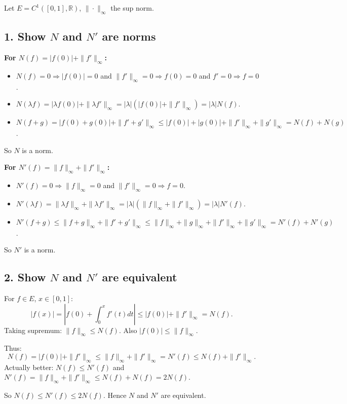 \documentclass[12pt]{article}
\begin{document}
\begin{answerbox}
Let $E = C^1([0,1], \mathbb{R})$, $\|\cdot\|_\infty$ the sup norm.

\subsection*{1. Show $N$ and $N'$ are norms}

\textbf{For $N(f) = |f(0)| + \|f'\|_\infty$:}
\begin{itemize}
    \item $N(f) = 0 \Rightarrow |f(0)| = 0$ and $\|f'\|_\infty = 0 \Rightarrow f(0) = 0$ and $f' = 0 \Rightarrow f = 0$.
    \item $N(\lambda f) = |\lambda f(0)| + \|\lambda f'\|_\infty = |\lambda|(|f(0)| + \|f'\|_\infty) = |\lambda| N(f)$.
    \item $N(f+g) = |f(0)+g(0)| + \|f'+g'\|_\infty \leq |f(0)| + |g(0)| + \|f'\|_\infty + \|g'\|_\infty = N(f) + N(g)$.
\end{itemize}
So $N$ is a norm.

\textbf{For $N'(f) = \|f\|_\infty + \|f'\|_\infty$:}
\begin{itemize}
    \item $N'(f) = 0 \Rightarrow \|f\|_\infty = 0$ and $\|f'\|_\infty = 0 \Rightarrow f = 0$.
    \item $N'(\lambda f) = \|\lambda f\|_\infty + \|\lambda f'\|_\infty = |\lambda|(\|f\|_\infty + \|f'\|_\infty) = |\lambda| N'(f)$.
    \item $N'(f+g) \leq \|f+g\|_\infty + \|f'+g'\|_\infty \leq \|f\|_\infty + \|g\|_\infty + \|f'\|_\infty + \|g'\|_\infty = N'(f) + N'(g)$.
\end{itemize}
So $N'$ is a norm.

\subsection*{2. Show $N$ and $N'$ are equivalent}

For $f \in E$, $x \in [0,1]$:
\[
|f(x)| = \left|f(0) + \int_0^x f'(t) dt\right| \leq |f(0)| + \|f'\|_\infty = N(f).
\]
Taking supremum: $\|f\|_\infty \leq N(f)$. Also $|f(0)| \leq \|f\|_\infty$.

Thus:
\[
N(f) = |f(0)| + \|f'\|_\infty \leq \|f\|_\infty + \|f'\|_\infty = N'(f) \leq N(f) + \|f'\|_\infty.
\]
Actually better: $N(f) \leq N'(f)$ and $N'(f) = \|f\|_\infty + \|f'\|_\infty \leq N(f) + N(f) = 2N(f)$.

So $N(f) \leq N'(f) \leq 2N(f)$. Hence $N$ and $N'$ are equivalent.


\end{answerbox}
\end{document}
